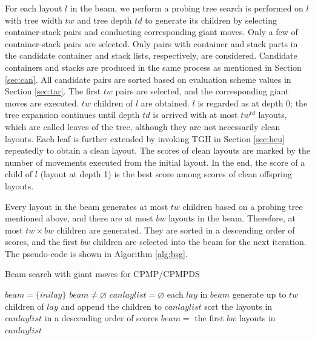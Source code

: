 \documentclass[review,3p,times,authoryear,12pt]{elsarticle}
\begin{document}
For each layout $l$ in the beam, we perform a probing tree search is performed on $l$ with tree width $\mathit{tw}$ and tree depth $\mathit{td}$ to generate its children by selecting container-stack pairs and conducting corresponding giant moves. 
Only a few of container-stack pairs are selected. 
Only pairs with container and stack parts in the candidate container and stack lists, respectively, are considered. 
Candidate containers and stacks are produced in the same process as mentioned in Section \ref{sec:can}.
All candidate pairs are sorted based on evaluation scheme values in Section \ref{sec:tar}. 
The first $\mathit{tw}$ pairs are selected, and the corresponding giant moves are executed. 
$\mathit{tw}$ children of $l$ are obtained. 
$l$ is regarded as at depth 0; the tree expansion continues until depth $\mathit{td}$ is arrived with at most $\mathit{tw}^\mathit{td}$ layouts, which are called leaves of the tree, although they are not necessarily clean layouts. 
Each leaf is further extended by invoking TGH in Section \ref{sec:heu} repeatedly to obtain a clean layout. 
The scores of clean layouts are marked by the number of movements executed from the initial layout. 
In the end, the score of a child of $l$ (layout at depth 1) is the best score among scores of clean offspring layouts.

Every layout in the beam generates at most $\mathit{tw}$ children based on a probing tree mentioned above, and there are at most $\mathit{bw}$ layouts in the beam. 
Therefore, at most $\mathit{tw}\times \mathit{bw}$ children are generated. 
They are sorted in a descending order of scores, and the first $\mathit{bw}$ children are selected into the beam for the next iteration.
The pseudo-code is shown in Algorithm \ref{alg:bsg}.

\begin{algorithm*}[htbp]
	\caption{Beam search with giant moves for CPMP/CPMPDS}
	\label{alg:bsg}
	\begin{codebox}
    \li $\mathit{beam} = \{\mathit{inilay}\}$
    \li \While $\mathit{beam} \neq \varnothing$
    \li \Do
        $\mathit{canlaylist}=\varnothing$
    \li \For each $\mathit{lay}$ in $\mathit{beam}$
    \li     \Do
             generate up to $\mathit{tw}$ children of $\mathit{lay}$ and append the children to $\mathit{canlaylist}$
             \End
    \li     sort the layouts in $\mathit{canlaylist}$ in a descending order of scores
    \li     $\mathit{beam} =$ the first $\mathit{bw}$ layouts in $\mathit{canlaylist}$
        \End
	\end{codebox}	
\end{algorithm*}
\end{document}
